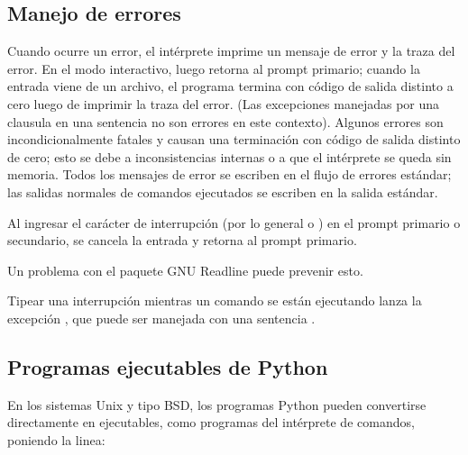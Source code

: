 \documentclass[a4,10pt,spanish]{sphinxmanual}
\begin{document}
\subsection{Manejo de errores}
\label{\detokenize{tutorial/appendix:error-handling}}\label{\detokenize{tutorial/appendix:tut-error}}
\sphinxAtStartPar
Cuando ocurre un error, el intérprete imprime un mensaje de error y la traza del error.  En el modo interactivo, luego retorna al prompt primario; cuando la entrada viene de un archivo, el programa termina con código de salida distinto a cero luego de imprimir la traza del error. (Las excepciones manejadas por una clausula  en una sentencia  no son errores en este contexto).  Algunos errores son incondicionalmente fatales y causan una terminación con código de salida distinto de cero; esto se debe a inconsistencias internas o a que el intérprete se queda sin memoria. Todos los mensajes de error se escriben en el flujo de errores estándar; las salidas normales de comandos ejecutados se escriben en la salida estándar.

\sphinxAtStartPar
Al ingresar el carácter de interrupción (por lo general  o ) en el prompt primario o secundario, se cancela la entrada y retorna al prompt primario.  %
\begin{footnote}[1]\sphinxAtStartFootnote
Un problema con el paquete GNU Readline puede prevenir esto.
%
\end{footnote} Tipear una interrupción mientras un comando se están ejecutando lanza la excepción , que puede ser manejada con una sentencia .


\subsection{Programas ejecutables de Python}
\label{\detokenize{tutorial/appendix:executable-python-scripts}}\label{\detokenize{tutorial/appendix:tut-scripts}}
\sphinxAtStartPar
En los sistemas Unix y tipo BSD, los programas Python pueden convertirse directamente en ejecutables, como programas del intérprete de comandos, poniendo la linea:

\begin{sphinxVerbatim}[commandchars=\\\{\}]
\end{sphinxVerbatim}
\end{document}
